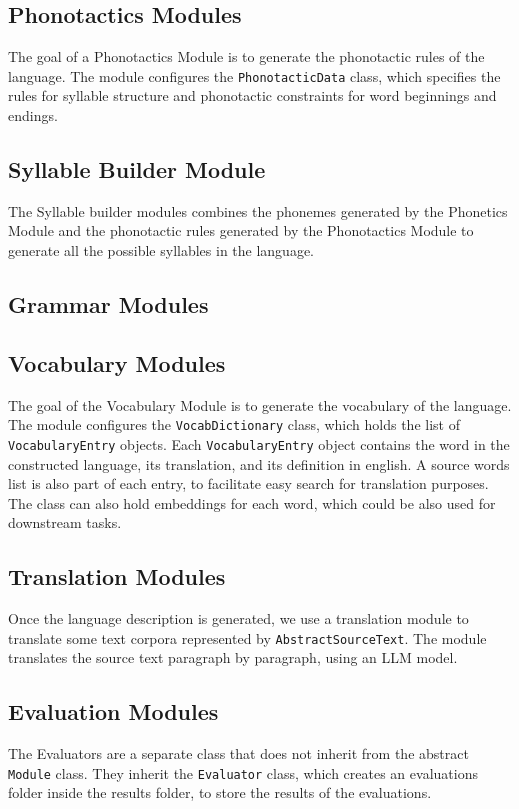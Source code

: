 \subsection{Phonotactics Modules}
The goal of a Phonotactics Module is to generate the phonotactic rules of the language. The module configures the \texttt{PhonotacticData} class, which
specifies the rules for syllable structure and phonotactic constraints for word beginnings and endings.

\subsection{Syllable Builder Module}
The Syllable builder modules combines the phonemes generated by the Phonetics Module and the phonotactic rules generated by the Phonotactics Module to
generate all the possible syllables in the language.

\subsection{Grammar Modules}

\subsection{Vocabulary Modules}
The goal of the Vocabulary Module is to generate the vocabulary of the language. The module configures the \texttt{VocabDictionary} class, which
holds the list of \texttt{VocabularyEntry} objects. Each \texttt{VocabularyEntry} object contains the word in the constructed language, its translation,
and its definition in english. 
A source words list is also part of each entry, to facilitate easy search for translation purposes. The class can also hold embeddings for each word, which could be also used for downstream tasks.

\subsection{Translation Modules}
Once the language description is generated, we use a translation module to translate some text corpora represented by \texttt{AbstractSourceText}.
The module translates the source text paragraph by paragraph, using an LLM model.

\subsection{Evaluation Modules}
The Evaluators are a separate class that does not inherit from the abstract \texttt{Module} class. They inherit the \texttt{Evaluator} class, which
creates an evaluations folder inside the results folder, to store the results of the evaluations. 